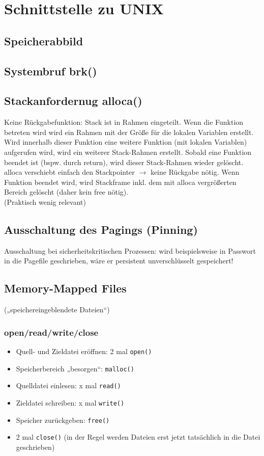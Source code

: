\section{Schnittstelle zu UNIX}
\subsection{Speicherabbild}
\subsection{Systembruf brk()}
\subsection{Stackanfordernug alloca()}
Keine Rückgabefunktion: Stack ist in Rahmen eingeteilt. Wenn die Funktion betreten wird wird ein Rahmen mit der Größe für die lokalen Variablen erstellt. Wird innerhalb dieser Funktion eine weitere Funktion (mit lokalen Variablen) aufgerufen wird, wird ein weiterer Stack-Rahmen erstellt. Sobald eine Funktion beendet ist (bspw. durch return), wird dieser Stack-Rahmen wieder gelöscht.\\
alloca verschiebt einfach den Stackpointer $\to$ keine Rückgabe nötig. Wenn Funktion beendet wird, wird Stackframe inkl. dem mit alloca vergrößerten Bereich gelöscht (daher kein free nötig).\\
(Praktisch wenig relevant)
\subsection{Ausschaltung des Pagings (Pinning)}
Ausschaltung bei sicherheitskritischen Prozessen: wird beispielsweise in Passwort in die Pagefile geschrieben, wäre er persistent unverschlüsselt gespeichert!
\subsection{Memory-Mapped Files}
(„speichereingeblendete Dateien“)\\
\subsubsection*{open/read/write/close}
\begin{itemize}
\item Quell- und Zieldatei eröffnen: 2 mal \lstinline`open()`
\item Speicherbereich „besorgen“: \lstinline`malloc()`
\item Quelldatei einlesen: x mal \lstinline`read()`
\item Zieldatei schreiben: x mal \lstinline`write()`
\item Speicher zurückgeben: \lstinline`free()`
\item 2 mal \lstinline`close()` (in der Regel werden Dateien erst jetzt tatsächlich in die Datei geschrieben)
\end{itemize}
